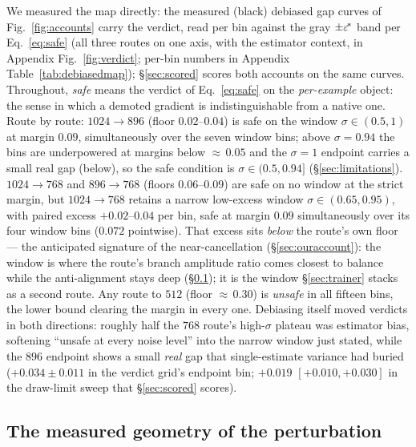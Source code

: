 We measured the map directly: the measured (black) debiased gap curves
of Fig.~\ref{fig:accounts} carry the verdict, read per bin against the
gray $\pm\varepsilon^{\!*}$ band per Eq.~\ref{eq:safe} (all three routes on one
axis, with the estimator context, in Appendix Fig.~\ref{fig:verdict};
per-bin numbers in Appendix Table~\ref{tab:debiasedmap});
\S\ref{sec:scored} scores both accounts on the same curves.
Throughout, \emph{safe} means the verdict of
Eq.~\ref{eq:safe} on the \emph{per-example} object: the sense in
which a demoted gradient is indistinguishable from a native one.
Route by route: $1024{\to}896$ (floor $0.02$--$0.04$) is
safe on the window $\sigma \in (0.5, 1)$ at margin $0.09$,
simultaneously over the seven window bins; above
$\sigma = 0.94$ the bins are underpowered at margins below
${\approx}\,0.05$ and the $\sigma{=}1$ endpoint carries a small real
gap (below), so the safe condition is $\sigma \in (0.5, 0.94]$
(\S\ref{sec:limitations}).
$1024{\to}768$ and $896{\to}768$ (floors $0.06$--$0.09$) are safe on no
window at the strict margin, but $1024{\to}768$ retains a narrow
low-excess window $\sigma \in (0.65, 0.95)$, with paired
excess $+0.02$--$0.04$ per bin, safe at margin $0.09$
simultaneously over its four window bins ($0.072$ pointwise). That
excess sits \emph{below} the route's own floor --- the anticipated
signature of the near-cancellation (\S\ref{sec:ouraccount}): the
window is where the route's branch amplitude ratio comes closest to
balance while the anti-alignment stays deep
(\S\ref{sec:observations}); it is the window \S\ref{sec:trainer}
stacks as a second route. Any route to $512$ (floor ${\approx}\,0.30$)
is \emph{unsafe} in all fifteen bins, the lower bound clearing the
margin in every one. Debiasing itself moved
verdicts in both directions: roughly half the $768$
route's high-$\sigma$ plateau was estimator bias, softening ``unsafe
at every noise level'' into the narrow window just stated, while the
$896$ endpoint shows a small \emph{real} gap that single-estimate
variance had buried ($+0.034 \pm 0.011$ in the verdict grid's
endpoint bin; $+0.019$ $[+0.010, +0.030]$ in the draw-limit sweep
that \S\ref{sec:scored} scores).

\subsection{The measured geometry of the perturbation}
\label{sec:observations}

